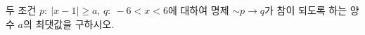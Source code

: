 두 조건 $p:\ |x-1|\ge a$, $q:\ -6<x<6$에 대하여 명제 $\sim p\longrightarrow q$가 참이 되도록 하는 양수 $a$의 최댓값을 구하시오.
